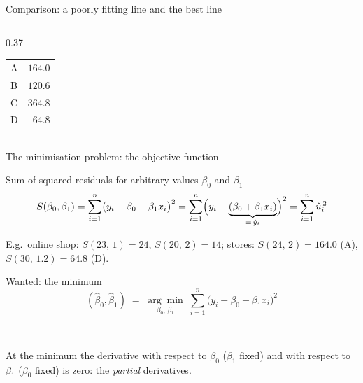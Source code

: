 \documentclass[aspectratio=169,11pt]{beamer}
\begin{document}
\begin{frame}{Comparison: a poorly fitting line and the best line}
\begin{columns}[T]
\begin{column}{0.37\textwidth}
\begin{center}
\begin{tabular}{lr}
          \midrule
          A & $164.0$ \\
          B & $120.6$ \\
          C & $364.8$ \\
          D & $\mathbf{64.8}$ \\
          \bottomrule
        \end{tabular}
      \end{center}
    \end{column}
  \end{columns}
\end{frame}

\begin{frame}{The minimisation problem: the objective function}
  \begin{block}{Sum of squared residuals for arbitrary values $\beta_0$ and $\beta_1$}
    \[
      S(\beta_0,\beta_1)
        = \sum_{i=1}^{n}\bigl(y_i - \beta_0 - \beta_1 x_i\bigr)^{2}
        = \sum_{i=1}^{n}\Bigl(y_i - \underbrace{(\beta_0 + \beta_1 x_i)}_{=\,\hat{y}_i}\Bigr)^{2}
        = \sum_{i=1}^{n}\hat{u}_i^{\,2}
    \]
    \vspace{-6pt}

    E.g.\ online shop: $S(23,\,1) = 24$, $S(20,\,2) = 14$; stores: $S(24,\,2) = 164.0$ (A),
    $S(30,\,1.2) = 64.8$ (D).
  \end{block}

  \begin{block}{Wanted: the minimum}
    \[
      (\hat{\beta}_0,\hat{\beta}_1)
      \;=\;
      \underset{\beta_0,\,\beta_1}{\arg\min}\;
      \sum_{i=1}^{n}\bigl(y_i - \beta_0 - \beta_1 x_i\bigr)^{2}
    \]
    \vspace{-10pt}
  \end{block}
  \\
  {\footnotesize At the minimum the derivative with respect to $\beta_0$
  ($\beta_1$ fixed) and with respect to $\beta_1$ ($\beta_0$ fixed) is zero:
  the \emph{partial} derivatives.\par}
\end{frame}
\end{document}
